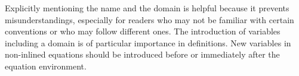 


\noindent Explicitly mentioning the name and the domain is helpful because it prevents misunderstandings, especially for readers who may not be familiar with certain conventions or who may follow different ones.
The introduction of variables including a domain is of particular importance in definitions.
New variables in non-inlined equations should be introduced before or immediately after the equation environment.
